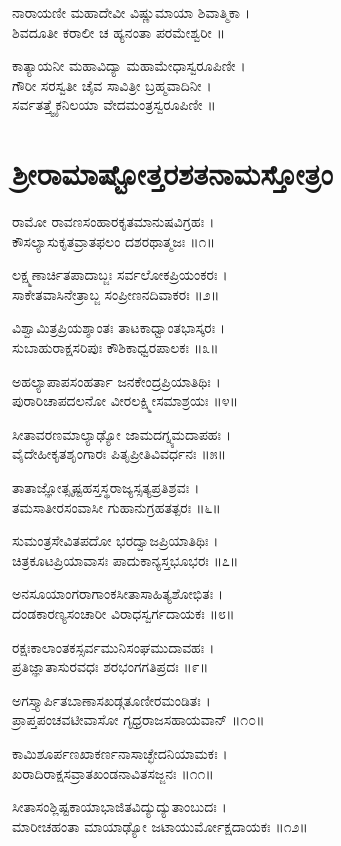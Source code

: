 ನಾರಾಯಣೀ ಮಹಾದೇವೀ ವಿಷ್ಣುಮಾಯಾ ಶಿವಾತ್ಮಿಕಾ ।\\
ಶಿವದೂತೀ ಕರಾಲೀ ಚ ಹ್ಯನಂತಾ ಪರಮೇಶ್ವರೀ ॥

ಕಾತ್ಯಾಯನೀ ಮಹಾವಿದ್ಯಾ ಮಹಾಮೇಧಾಸ್ವರೂಪಿಣೀ ।\\
ಗೌರೀ ಸರಸ್ವತೀ ಚೈವ ಸಾವಿತ್ರೀ ಬ್ರಹ್ಮವಾದಿನೀ ।\\
ಸರ್ವತತ್ತ್ವೈಕನಿಲಯಾ ವೇದಮಂತ್ರಸ್ವರೂಪಿಣೀ ॥

\section{ಶ್ರೀರಾಮಾಷ್ಟೋತ್ತರಶತನಾಮಸ್ತೋತ್ರಂ}

ರಾಮೋ ರಾವಣಸಂಹಾರಕೃತಮಾನುಷವಿಗ್ರಹಃ ।\\
ಕೌಸಲ್ಯಾಸುಕೃತವ್ರಾತಫಲಂ ದಶರಥಾತ್ಮಜಃ ॥೧॥

ಲಕ್ಷ್ಮಣಾರ್ಚಿತಪಾದಾಬ್ಜಃ ಸರ್ವಲೋಕಪ್ರಿಯಂಕರಃ ।\\
ಸಾಕೇತವಾಸಿನೇತ್ರಾಬ್ಜ ಸಂಪ್ರೀಣನದಿವಾಕರಃ ॥೨॥

ವಿಶ್ವಾಮಿತ್ರಪ್ರಿಯಶ್ಶಾಂತಃ ತಾಟಕಾಧ್ವಾಂತಭಾಸ್ಕರಃ ।\\
ಸುಬಾಹುರಾಕ್ಷಸರಿಪುಃ ಕೌಶಿಕಾಧ್ವರಪಾಲಕಃ ॥೩॥

ಅಹಲ್ಯಾಪಾಪಸಂಹರ್ತಾ ಜನಕೇಂದ್ರಪ್ರಿಯಾತಿಥಿಃ ।\\
ಪುರಾರಿಚಾಪದಲನೋ ವೀರಲಕ್ಷ್ಮೀಸಮಾಶ್ರಯಃ ॥೪॥

ಸೀತಾವರಣಮಾಲ್ಯಾಢ್ಯೋ ಜಾಮದಗ್ನ್ಯಮದಾಪಹಃ ।\\
ವೈದೇಹೀಕೃತಶೃಂಗಾರಃ ಪಿತೃಪ್ರೀತಿವಿವರ್ಧನಃ ॥೫॥

ತಾತಾಜ್ಞೋತ್ಸೃಷ್ಟಹಸ್ತಸ್ಥರಾಜ್ಯಸ್ಸತ್ಯಪ್ರತಿಶ್ರವಃ ।\\
ತಮಸಾತೀರಸಂವಾಸೀ ಗುಹಾನುಗ್ರಹತತ್ಪರಃ ॥೬॥

ಸುಮಂತ್ರಸೇವಿತಪದೋ ಭರದ್ವಾಜಪ್ರಿಯಾತಿಥಿಃ ।\\
ಚಿತ್ರಕೂಟಪ್ರಿಯಾವಾಸಃ ಪಾದುಕಾನ್ಯಸ್ತಭೂಭರಃ ॥೭॥

ಅನಸೂಯಾಂಗರಾಗಾಂಕಸೀತಾಸಾಹಿತ್ಯಶೋಭಿತಃ ।\\
ದಂಡಕಾರಣ್ಯಸಂಚಾರೀ ವಿರಾಧಸ್ವರ್ಗದಾಯಕಃ ॥೮॥

ರಕ್ಷಃಕಾಲಾಂತಕಸ್ಸರ್ವಮುನಿಸಂಘಮುದಾವಹಃ ।\\
ಪ್ರತಿಜ್ಞಾತಾಸುರವಧಃ ಶರಭಂಗಗತಿಪ್ರದಃ ॥೯॥

ಅಗಸ್ತ್ಯಾರ್ಪಿತಬಾಣಾಸಖಡ್ಗತೂಣೀರಮಂಡಿತಃ ।\\
ಪ್ರಾಪ್ತಪಂಚವಟೀವಾಸೋ ಗೃಧ್ರರಾಜಸಹಾಯವಾನ್ ॥೧೦॥

ಕಾಮಿಶೂರ್ಪಣಖಾಕರ್ಣನಾಸಾಚ್ಛೇದನಿಯಾಮಕಃ ।\\
ಖರಾದಿರಾಕ್ಷಸವ್ರಾತಖಂಡನಾವಿತಸಜ್ಜನಃ ॥೧೧॥

ಸೀತಾಸಂಶ್ಲಿಷ್ಟಕಾಯಾಭಾಜಿತವಿದ್ಯುದ್ಯುತಾಂಬುದಃ ।\\
ಮಾರೀಚಹಂತಾ ಮಾಯಾಢ್ಯೋ ಜಟಾಯುರ್ಮೋಕ್ಷದಾಯಕಃ ॥೧೨॥

